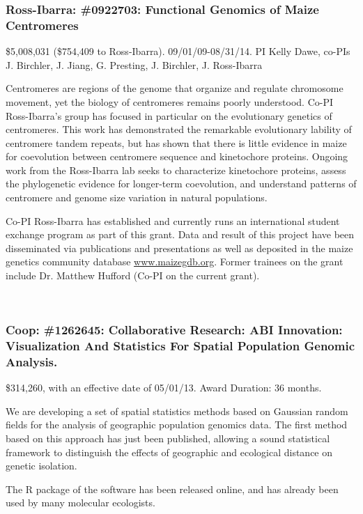 \subsubsection*{Ross-Ibarra: \#0922703: Functional Genomics of Maize Centromeres}
\$5,008,031 (\$754,409 to Ross-Ibarra). 09/01/09-08/31/14. PI Kelly Dawe, co-PIs J. Birchler, J. Jiang, G. Presting, J. Birchler, J. Ross-Ibarra
\par{} Centromeres are regions of the genome that organize and regulate chromosome movement, yet the biology of centromeres remains poorly understood. Co-PI Ross-Ibarra's group has focused in particular on the evolutionary genetics of centromeres. This work has demonstrated the remarkable evolutionary lability of centromere tandem repeats, but has shown that there is little evidence in maize for coevolution between centromere sequence and kinetochore proteins. Ongoing work from the Ross-Ibarra lab seeks to characterize kinetochore proteins, assess the phylogenetic evidence for longer-term coevolution, and understand patterns of centromere and genome size variation in natural populations. 
\par{}  Co-PI Ross-Ibarra has established and currently runs an international student exchange program as part of this grant. Data and result of this project have been disseminated via publications and presentations as well as deposited in the maize genetics community database \url{www.maizegdb.org}. Former trainees on the grant include Dr. Matthew Hufford (Co-PI on the current grant). 
\par{} \citet{Shi2010a, Chia2012a, Fang2012a, Hufford2012, Hufford2012b, Hufford2013, Melters2013a, Kanizay2013, Pyhajarvi2013}

\subsubsection*{Coop: \#1262645: Collaborative Research: ABI Innovation: Visualization And Statistics For Spatial Population Genomic Analysis. }
\$314,260, with an effective date of 05/01/13. Award Duration: 36 months.
\par{} We are developing a set of spatial statistics methods based on Gaussian random fields for the analysis of geographic population genomics data. The first method based on this approach has just been published, allowing a sound statistical framework to distinguish the effects of geographic and ecological distance on genetic isolation. 
\par{}  The R package of the software has been released online, and has already been used by many molecular ecologists. 
\par{} \citet{bradburd2013}

